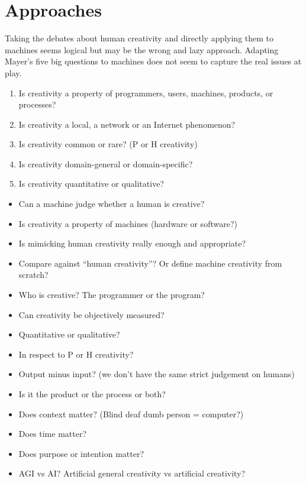 \section{Approaches}

Taking the debates about human creativity  and directly applying them to machines seems logical but may be the wrong and lazy approach. Adapting Mayer’s five big questions to machines does not seem to capture the real issues at play.

\begin{enumerate}
  \item Is creativity a property of programmers, users, machines, products, or processes?
  \item Is creativity a local, a network or an Internet phenomenon?
  \item Is creativity common or rare? (P or H creativity)
  \item Is creativity domain-general or domain-specific?
  \item Is creativity quantitative or qualitative?
\end{enumerate}

\begin{fcom}
  \begin{itemize}
  \item Can a machine judge whether a human is creative?
  \item Is creativity a property of machines (hardware or software?)
  \item Is mimicking human creativity really enough and appropriate?
  \item Compare against ``human creativity''? Or define machine creativity from scratch?
  \item Who is creative? The programmer or the program?
  \item Can creativity be objectively measured?
  \item Quantitative or qualitative?
  \item In respect to P or H creativity?
  \item Output minus input? (we don’t have the same strict judgement on humans)
  \item Is it the product or the process or both?
  \item Does context matter? (Blind deaf dumb person = computer?)
  \item Does time matter?
  \item Does purpose or intention matter?
  \item AGI vs AI? Artificial general creativity vs artificial creativity?
  \end{itemize}
\end{fcom}

